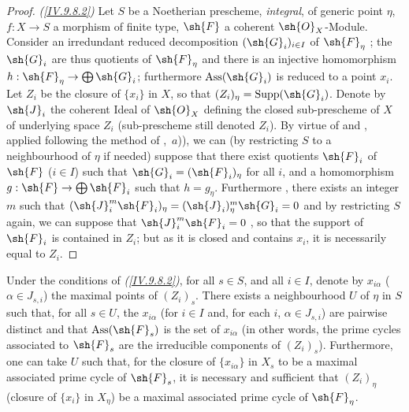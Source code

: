 \begin{proof}
\medskip
\noindent
\emph{(\ref{IV.9.8.2})}
\label{IV.9.8.2}
Let $S$ be a Noetherian prescheme, \emph{integral}, of generic point $\eta$, $f:X\to S$ a morphism of finite type, $\sh{F}$ a coherent $\sh{O}_X$-Module.
Consider an irredundant reduced decomposition $(\sh{G}_i)_{i\in I}$ of $\sh{F}_\eta$ ; the $\sh{G}_i$ are thus quotients of $\sh{F}_\eta$ and there is an injective homomorphism $h:\sh{F}_\eta\to\bigoplus\sh{G}_i$; furthermore $\operatorname{Ass}(\sh{G}_i)$ is reduced to a point $x_i$.
Let $Z_i$ be the closure of $\{x_i\}$ in $X$, so that $(Z_i)_\eta=\operatorname{Supp}(\sh{G}_i)$.
Denote by $\sh{J}_i$ the coherent Ideal of $\sh{O}_X$ defining the closed sub-prescheme of $X$ of underlying space $Z_i$ (sub-prescheme still denoted $Z_i$).
By virtue of  and , applied following the method of ,~$a$)), we can (by restricting $S$ to a neighbourhood of $\eta$ if needed) suppose that there exist quotients $\sh{F}_i$ of $\sh{F}$ ($i\in I$) such that $\sh{G}_i=(\sh{F}_i)_\eta$ for all $i$, and a homomorphism $g:\sh{F}\to\bigoplus\sh{F}_i$ such that $h=g_\eta$.
Furthermore , there exists an integer $m$ such that $(\sh{J}_i^m\sh{F}_i)_\eta=(\sh{J}_i)^m_\eta\sh{G}_i=0$ and by restricting $S$ again, we can suppose that $\sh{J}_i^m\sh{F}_i=0$ , so that the support of $\sh{F}_i$ is contained in $Z_i$; but as it is closed and contains $x_i$, it is necessarily equal to $Z_i$.
\end{proof}

\begin{proposition}[9.8.3]
\label{IV.9.8.3}
Under the conditions of \emph{(\ref{IV.9.8.2})}, for all $s\in S$, and all $i\in I$, denote by $x_{i\alpha}$ ($\alpha\in J_{s,i}$) the maximal points of $(Z_i)_s$.
There exists a neighbourhood $U$ of $\eta$ in $S$ such that, for all $s\in U$, the $x_{i\alpha}$ (for $i\in I$ and, for each $i$, $\alpha\in J_{s,i}$) are pairwise distinct and that $\operatorname{Ass}(\sh{F}_s)$ is the set of $x_{i\alpha}$ (in other words, the prime cycles associated to $\sh{F}_s$ are the irreducible components of $(Z_i)_s$).
Furthermore, one can take $U$ such that, for the closure of $\{x_{i\alpha}\}$ in $X_s$ to be a maximal associated prime cycle of $\sh{F}_s$, it is necessary and sufficient that $(Z_i)_\eta$ (closure of $\{x_i\}$ in $X_\eta$) be a maximal associated prime cycle of $\sh{F}_\eta$.
\end{proposition}

